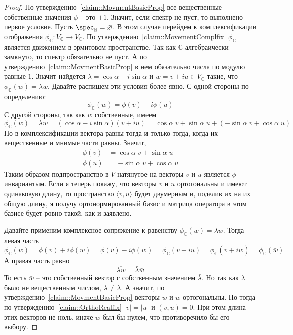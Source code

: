\begin{proof}
По утверждению~\ref{claim::MovmentBasicProp} все вещественные собственные значения $\phi$ -- это $\pm 1$.
Значит, если спектр не пуст, то выполнено первое условие.
Пусть $\spec_\mathbb R= \varnothing$.
В этом случае перейдем к комплексификации отображения $\phi_\mathbb C\colon V_\mathbb C\to V_\mathbb C$.
По утверждению~\ref{claim::MovementComplfix} $\phi_\mathbb C$ является движением в эрмитовом пространстве.
Так как $\mathbb C$ алгебраически замкнуто, то спектр обязательно не пуст.
А по утверждению~\ref{claim::MovmentBasicProp} в нем обязательно числа по модулю равные $1$.
Значит найдется $\lambda = \cos \alpha - i \sin \alpha$ и $w= v + i u\in V_\mathbb C$ такие, что $\phi_\mathbb C(w) = \lambda w$.
Давайте распишем эти условия более явно.
С одной стороны по определению:
\[
\phi_\mathbb C(w) = \phi(v) + i\phi(u)
\]
С другой стороны, так как $w$ собственные, имеем
\[
\phi_\mathbb C(w) = \lambda w = (\cos \alpha - i \sin \alpha) (v+ i u) = \cos \alpha \;v + \sin \alpha\; u + (-\sin \alpha\; v +\cos\alpha\; u)
\]
Но в комплексификации вектора равны тогда и только тогда, когда их вещественные и мнимые части равны.
Значит,
\begin{align*}
\phi(v) &= \cos \alpha\; v + \sin \alpha\; u\\
\phi(u) &= -\sin \alpha\; v +\cos\alpha\; u
\end{align*}
Таким образом подпространство в $V$ натянутое на векторы $v$ и $u$ является $\phi$ инвариантым.
Если я теперь покажу, что векторы $v$ и $u$ ортогональны и имеют одинаковую длину, то пространство $\langle v,u\rangle$ будет двумерным и, поделив их на их общую длину, я получу ортонормированный базис и матрица оператора в этом базисе будет ровно такой, как и заявлено.

Давайте применим комплексное сопряжение к равенству $\phi_\mathbb C(w) = \lambda w$.
Тогда левая часть
\[
\overline{\phi_\mathbb C(w)} = \overline{\phi(v) + i \phi(w)} = \phi(v) - i \phi(w) = \phi_\mathbb C(v - iu) = \phi_\mathbb C(\overline{v + i w}) = \phi_\mathbb C(\bar w)
\]
А правая часть равно
\[
\overline{\lambda w} = \bar \lambda \bar w
\]
То есть $\bar w$ -- это собственный вектор с собственным значением $\bar \lambda$.
Но так как $\lambda$ было не вещественным числом, $\lambda \neq \bar\lambda$.
А значит, по утверждению~\ref{claim::MovmentBasicProp} векторы $w$ и $\bar w$ ортогональны.
Но тогда по утверждению~\ref{claim::OrthoRealfix} $|v| = |u|$ и $(v, u) = 0$.
При этом длина этих векторов не ноль, иначе $w$ был бы нулем, что противоречило бы его выбору.

\end{proof}

